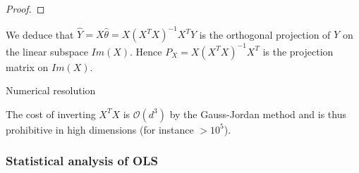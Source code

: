 \documentclass[
10pt, %
a4paper, %
oneside, %
headinclude,footinclude, %
BCOR5mm, %
]{scrartcl}
\begin{document}
\begin{proof}
% 
% 
% 
% 
% 
% 
% 
% 
% 
% 

\end{proof}

\begin{remark}

    We deduce that $ \hat{Y} = X \hat{\theta} = X(X^TX)^{-1}X^TY$ is the orthogonal projection of $Y$ on the linear subspace $ Im(X)$. Hence $P_X = X(X^TX)^{-1}X^T$ is the projection matrix on $Im(X)$.
    
\end{remark}


\begin{remark}{Numerical resolution}

The cost of inverting $X^TX$ is $ \mathcal{O} (d^3)$ by the Gauss-Jordan method and is thus prohibitive in high dimensions (for instance $ > 10^5$).
\end{remark}


\subsubsection{\large\color{Periwinkle}Statistical analysis of OLS}
\end{document}
